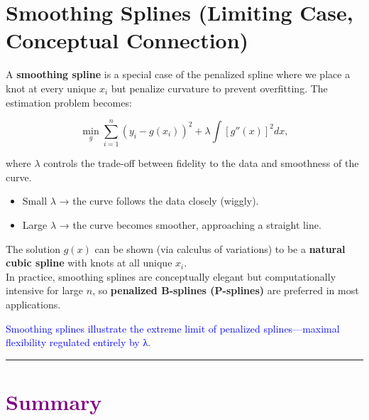\documentclass[
  letterpaper,
  DIV=11,
  numbers=noendperiod]{scrreprt}
\providecommand{\tightlist}{%
  \setlength{\itemsep}{0pt}\setlength{\parskip}{0pt}}\usepackage{longtable,booktabs,array}
\begin{document}
\hypertarget{smoothing-splines-limiting-case-conceptual-connection}{%
\section*{Smoothing Splines (Limiting Case, Conceptual
Connection)}\label{smoothing-splines-limiting-case-conceptual-connection}}


A \textbf{smoothing spline} is a special case of the penalized spline
where we place a knot at every unique \(x_i\) but penalize curvature to
prevent overfitting. The estimation problem becomes:

\[
\min_g \sum_{i=1}^{n} (y_i - g(x_i))^2 + \lambda \int [g''(x)]^2 dx,
\]

where \(\lambda\) controls the trade-off between fidelity to the data
and smoothness of the curve.

\begin{itemize}
\tightlist
\item
  Small \(\lambda\) → the curve follows the data closely (wiggly).\\
\item
  Large \(\lambda\) → the curve becomes smoother, approaching a straight
  line.
\end{itemize}

The solution \(g(x)\) can be shown (via calculus of variations) to be a
\textbf{natural cubic spline} with knots at all unique \(x_i\).\\
In practice, smoothing splines are conceptually elegant but
computationally intensive for large \(n\), so \textbf{penalized
B-splines (P-splines)} are preferred in most applications.

\textcolor{blue}{Smoothing splines illustrate the extreme limit of penalized splines—maximal flexibility regulated entirely by λ.}

\begin{center}\rule{0.5\linewidth}{0.5pt}\end{center}

\hypertarget{section-29}{%
\section*{\texorpdfstring{\textcolor{purple}{Summary}}{}}\label{section-29}}
\end{document}
